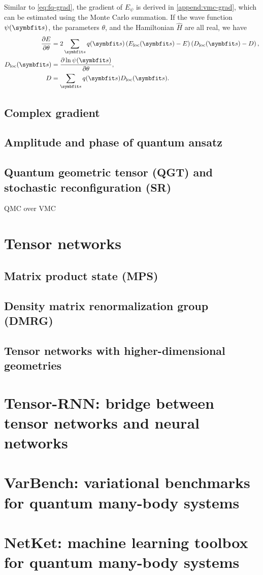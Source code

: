 Similar to \cref{eq:fq-grad}, the gradient of $E_\psi$ is derived in \cref{append:vmc-grad}, which can be estimated using the Monte Carlo summation. If the wave function $\psi(\vs)$, the parameters $\theta$, and the Hamiltonian $\hat{H}$ are all real, we have
\begin{align}
\frac{\partial E}{\partial \theta} &= 2 \sum_\vs q(\vs) \left( E_\text{loc}(\vs) - E \right) \left( D_\text{loc}(\vs) - D \right), \label{eq:vmc-grad} \\
D_\text{loc}(\vs) &= \frac{\partial \ln \psi(\vs)}{\partial \theta}, \\
D &= \sum_\vs q(\vs) D_\text{loc}(\vs).
\end{align}






\section{Complex gradient}

\section{Amplitude and phase of quantum ansatz}

\section{Quantum geometric tensor (QGT) and stochastic reconfiguration (SR)}

QMC over VMC

\chapter{Tensor networks}

\section{Matrix product state (MPS)}

\section{Density matrix renormalization group (DMRG)}

\section{Tensor networks with higher-dimensional geometries}

\chapter{Tensor-RNN: bridge between tensor networks and neural networks}

\chapter{VarBench: variational benchmarks for quantum many-body systems}

\chapter{NetKet: machine learning toolbox for quantum many-body systems}
